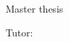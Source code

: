 \begin{titlepage}
    \begin{center}
        \vspace*{1cm}
        
        \Huge
        \textbf{\myTitle}
        
        \vspace{1cm}
        \LARGE
    
        \textbf{\myName \mySurname}
        
        \vfill
        
        Master thesis
        
        \Large
    
        Tutor: \myTutor

        \vspace{1.8cm}
        
        \textbf{\myUniversity}\\
        \myDepartament\\
        \myLocation \currentYear
        
    \end{center}
    
\end{titlepage}